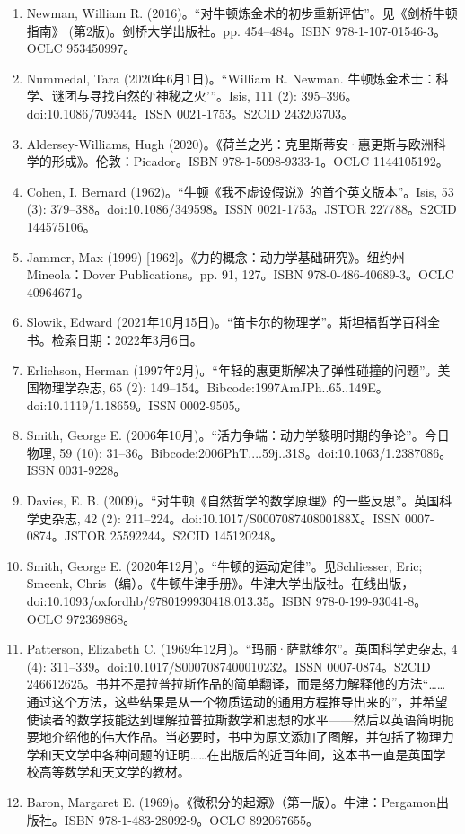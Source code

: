 \begin{enumerate}
\item Newman, William R. (2016)。“对牛顿炼金术的初步重新评估”。见《剑桥牛顿指南》 (第2版)。剑桥大学出版社。pp. 454–484。ISBN 978-1-107-01546-3。OCLC 953450997。
\item Nummedal, Tara (2020年6月1日)。“William R. Newman. 牛顿炼金术士：科学、谜团与寻找自然的‘神秘之火’”。Isis, 111 (2): 395–396。doi:10.1086/709344。ISSN 0021-1753。S2CID 243203703。
\item Aldersey-Williams, Hugh (2020)。《荷兰之光：克里斯蒂安·惠更斯与欧洲科学的形成》。伦敦：Picador。ISBN 978-1-5098-9333-1。OCLC 1144105192。
\item Cohen, I. Bernard (1962)。“牛顿《我不虚设假说》的首个英文版本”。Isis, 53 (3): 379–388。doi:10.1086/349598。ISSN 0021-1753。JSTOR 227788。S2CID 144575106。
\item Jammer, Max (1999) [1962]。《力的概念：动力学基础研究》。纽约州Mineola：Dover Publications。pp. 91, 127。ISBN 978-0-486-40689-3。OCLC 40964671。
\item Slowik, Edward (2021年10月15日)。“笛卡尔的物理学”。斯坦福哲学百科全书。检索日期：2022年3月6日。
\item Erlichson, Herman (1997年2月)。“年轻的惠更斯解决了弹性碰撞的问题”。美国物理学杂志, 65 (2): 149–154。Bibcode:1997AmJPh..65..149E。doi:10.1119/1.18659。ISSN 0002-9505。
\item Smith, George E. (2006年10月)。“活力争端：动力学黎明时期的争论”。今日物理, 59 (10): 31–36。Bibcode:2006PhT....59j..31S。doi:10.1063/1.2387086。ISSN 0031-9228。
\item Davies, E. B. (2009)。“对牛顿《自然哲学的数学原理》的一些反思”。英国科学史杂志, 42 (2): 211–224。doi:10.1017/S000708740800188X。ISSN 0007-0874。JSTOR 25592244。S2CID 145120248。
\item Smith, George E. (2020年12月)。“牛顿的运动定律”。见Schliesser, Eric; Smeenk, Chris（编）。《牛顿牛津手册》。牛津大学出版社。在线出版，doi:10.1093/oxfordhb/9780199930418.013.35。ISBN 978-0-199-93041-8。OCLC 972369868。
\item Patterson, Elizabeth C. (1969年12月)。“玛丽·萨默维尔”。英国科学史杂志, 4 (4): 311–339。doi:10.1017/S0007087400010232。ISSN 0007-0874。S2CID 246612625。书并不是拉普拉斯作品的简单翻译，而是努力解释他的方法“……通过这个方法，这些结果是从一个物质运动的通用方程推导出来的”，并希望使读者的数学技能达到理解拉普拉斯数学和思想的水平——然后以英语简明扼要地介绍他的伟大作品。当必要时，书中为原文添加了图解，并包括了物理力学和天文学中各种问题的证明……在出版后的近百年间，这本书一直是英国学校高等数学和天文学的教材。
\item Baron, Margaret E. (1969)。《微积分的起源》（第一版）。牛津：Pergamon出版社。ISBN 978-1-483-28092-9。OCLC 892067655。

\end{enumerate}
